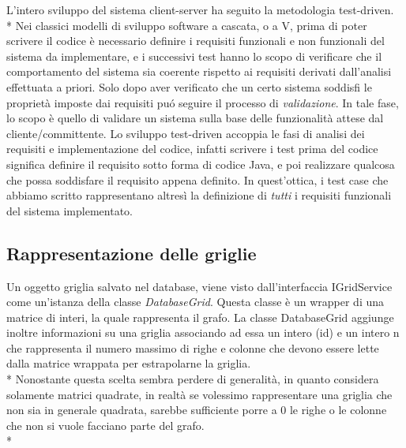 L'intero sviluppo del sistema client-server ha seguito la metodologia test-driven.\\*
Nei classici modelli di sviluppo software a cascata, o a V, prima di poter scrivere il codice \`e necessario definire i requisiti funzionali e non funzionali del sistema da implementare, e i successivi test hanno lo scopo di verificare che il comportamento del sistema sia coerente rispetto ai requisiti derivati dall'analisi effettuata a priori. Solo dopo aver verificato che un certo sistema soddisfi le propriet\`a imposte dai requisiti pu\'o seguire il processo di \emph{validazione}. In tale fase, lo scopo \`e quello di validare un sistema sulla base delle funzionalit\`a attese dal cliente/committente.  Lo sviluppo test-driven accoppia le fasi di analisi dei requisiti e implementazione del codice, infatti scrivere i test prima del codice significa definire il requisito sotto forma di codice Java, e poi realizzare qualcosa che possa soddisfare il requisito appena definito. In quest'ottica, i test case che abbiamo scritto rappresentano altres\`i la definizione di \emph{tutti} i requisiti funzionali del sistema implementato.
\subsection{Rappresentazione delle griglie}
Un oggetto griglia salvato nel database, viene visto dall'interfaccia IGridService come un'istanza della classe \emph{DatabaseGrid}. Questa classe \`e un wrapper di una matrice di interi, la quale rappresenta il grafo. La classe DatabaseGrid aggiunge inoltre informazioni su una griglia associando ad essa un intero (id) e un intero n che rappresenta il numero massimo di righe e colonne che devono essere lette dalla matrice wrappata per estrapolarne la griglia.\\*
Nonostante questa scelta sembra perdere di generalit\`a, in quanto considera solamente matrici quadrate, in realt\`a se volessimo rappresentare una griglia che non sia in generale quadrata, sarebbe sufficiente porre a $0$ le righe o le colonne che non si vuole facciano parte del grafo.\\*
